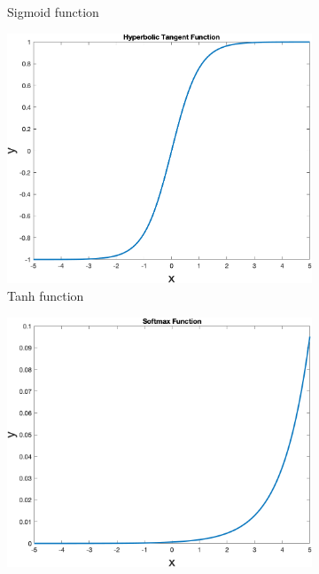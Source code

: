 \documentclass[12pt]{article}
\begin{document}
\begin{figure}
\begin{subfigure}[b]{0.4\textwidth}
            \caption{Sigmoid function}
            \label{fig:sigmoid}
        \end{subfigure}
        \begin{subfigure}[b]{0.4\textwidth}
            \includegraphics[width=\textwidth]{figures/tanh}
            \caption{Tanh function}
            \label{fig:tahn}
        \end{subfigure}
        \hspace{0.1\textwidth}
        \begin{subfigure}[b]{0.4\textwidth}
            \includegraphics[width=\textwidth]{figures/softmax}

\end{subfigure}
\end{figure}
\end{document}
